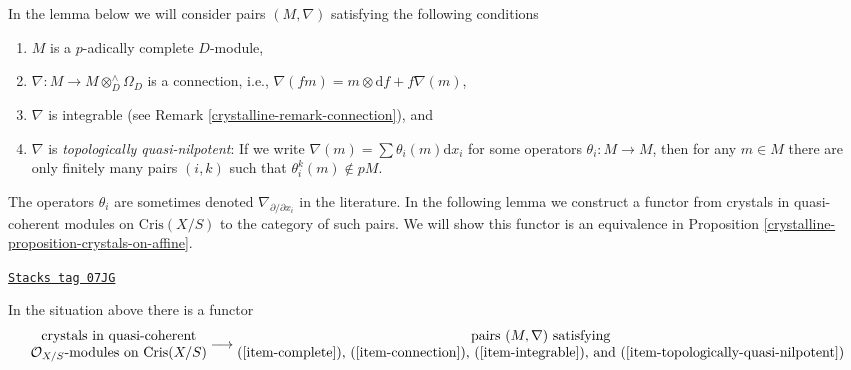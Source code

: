 In the lemma below we will consider pairs $(M, \nabla)$ satisfying the
following conditions
\begin{enumerate}
\item
\label{crystalline-item-complete}
$M$ is a $p$-adically complete $D$-module,
\item
\label{crystalline-item-connection}
$\nabla : M \to M \otimes^\wedge_D \Omega_D$ is a connection, i.e.,
$\nabla(fm) = m \otimes \text{d}f + f\nabla(m)$,
\item
\label{crystalline-item-integrable}
$\nabla$ is integrable
(see Remark \ref{crystalline-remark-connection}), and
\item
\label{crystalline-item-topologically-quasi-nilpotent}
$\nabla$ is {\it topologically quasi-nilpotent}: If we write
$\nabla(m) = \sum \theta_i(m)\text{d}x_i$ for some operators
$\theta_i : M \to M$, then for any $m \in M$ there are only finitely
many pairs $(i, k)$ such that $\theta_i^k(m) \not \in pM$.
\end{enumerate}
The operators $\theta_i$ are sometimes denoted
$\nabla_{\partial/\partial x_i}$ in the literature.
In the following lemma we construct a functor from crystals in quasi-coherent
modules on $\text{Cris}(X/S)$ to the category of such pairs. We will show
this functor is an equivalence in
Proposition \ref{crystalline-proposition-crystals-on-affine}.

\begin{lemma}
\label{crystalline-lemma-crystals-on-affine}
\href{https://stacks.math.columbia.edu/tag/07JG}{\texttt{Stacks tag 07JG}}

In the situation above there is a functor
$$
\begin{matrix}
\text{crystals in quasi-coherent} \\
\mathcal{O}_{X/S}\text{-modules on }\text{Cris}(X/S)
\end{matrix}
\longrightarrow
\begin{matrix}
\text{pairs }(M, \nabla)\text{ satisfying} \\
\text{(\ref{item-complete}), (\ref{item-connection}),
(\ref{item-integrable}), and (\ref{item-topologically-quasi-nilpotent})}
\end{matrix}
$$
\end{lemma}

